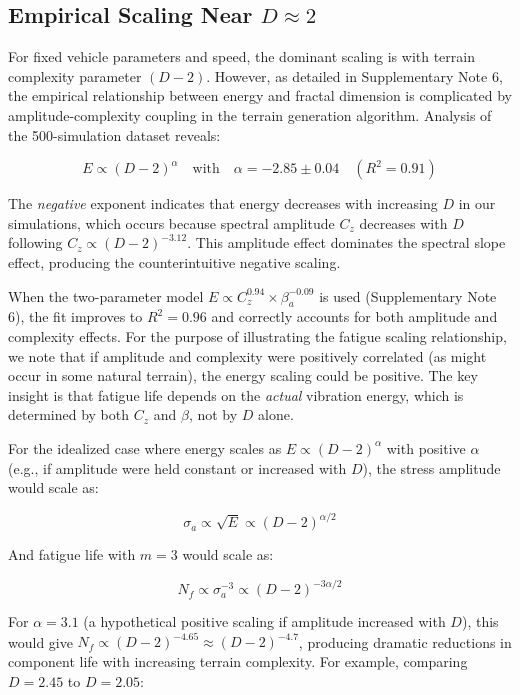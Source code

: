 \documentclass[11pt]{article}
\begin{document}
\subsection{Empirical Scaling Near $D \approx 2$}

For fixed vehicle parameters and speed, the dominant scaling is with terrain complexity parameter $(D-2)$. However, as detailed in Supplementary Note 6, the empirical relationship between energy and fractal dimension is complicated by amplitude-complexity coupling in the terrain generation algorithm. Analysis of the 500-simulation dataset reveals:

\begin{equation}
E \propto (D-2)^\alpha \quad \text{with} \quad \alpha = -2.85 \pm 0.04 \quad (R^2 = 0.91)
\end{equation}

The \textit{negative} exponent indicates that energy decreases with increasing $D$ in our simulations, which occurs because spectral amplitude $C_z$ decreases with $D$ following $C_z \propto (D-2)^{-3.12}$. This amplitude effect dominates the spectral slope effect, producing the counterintuitive negative scaling.

When the two-parameter model $E \propto C_z^{0.94} \times \beta_a^{-0.09}$ is used (Supplementary Note 6), the fit improves to $R^2 = 0.96$ and correctly accounts for both amplitude and complexity effects. For the purpose of illustrating the fatigue scaling relationship, we note that if amplitude and complexity were positively correlated (as might occur in some natural terrain), the energy scaling could be positive. The key insight is that fatigue life depends on the \textit{actual} vibration energy, which is determined by both $C_z$ and $\beta$, not by $D$ alone.

For the idealized case where energy scales as $E \propto (D-2)^\alpha$ with positive $\alpha$ (e.g., if amplitude were held constant or increased with $D$), the stress amplitude would scale as:

\begin{equation}
\sigma_a \propto \sqrt{E} \propto (D-2)^{\alpha/2}
\end{equation}

And fatigue life with $m = 3$ would scale as:

\begin{equation}
N_f \propto \sigma_a^{-3} \propto (D-2)^{-3\alpha/2}
\end{equation}

For $\alpha = 3.1$ (a hypothetical positive scaling if amplitude increased with $D$), this would give $N_f \propto (D-2)^{-4.65} \approx (D-2)^{-4.7}$, producing dramatic reductions in component life with increasing terrain complexity. For example, comparing $D = 2.45$ to $D = 2.05$:
\end{document}
